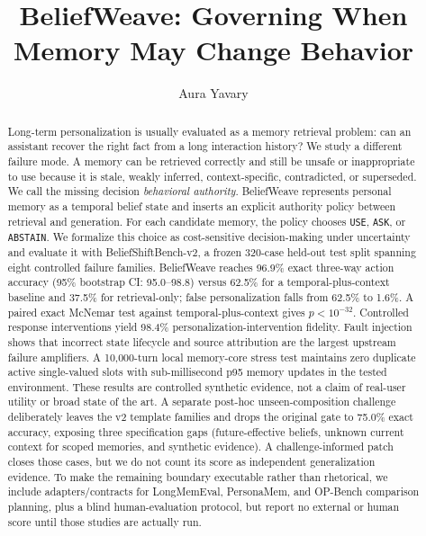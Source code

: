 \documentclass[10pt]{article}
\title{\vspace{-1.1em}\textbf{BeliefWeave: Governing When Memory May Change Behavior}}
\author{Aura Yavary}
\date{}
\begin{document}
\maketitle

\begin{abstract}
Long-term personalization is usually evaluated as a memory retrieval problem: can an assistant recover the right fact from a long interaction history? We study a different failure mode. A memory can be retrieved correctly and still be unsafe or inappropriate to use because it is stale, weakly inferred, context-specific, contradicted, or superseded. We call the missing decision \emph{behavioral authority}. BeliefWeave represents personal memory as a temporal belief state and inserts an explicit authority policy between retrieval and generation. For each candidate memory, the policy chooses \texttt{USE}, \texttt{ASK}, or \texttt{ABSTAIN}. We formalize this choice as cost-sensitive decision-making under uncertainty and evaluate it with BeliefShiftBench-v2, a frozen 320-case held-out test split spanning eight controlled failure families. BeliefWeave reaches 96.9\% exact three-way action accuracy (95\% bootstrap CI: 95.0--98.8) versus 62.5\% for a temporal-plus-context baseline and 37.5\% for retrieval-only; false personalization falls from 62.5\% to 1.6\%. A paired exact McNemar test against temporal-plus-context gives $p<10^{-32}$. Controlled response interventions yield 98.4\% personalization-intervention fidelity. Fault injection shows that incorrect state lifecycle and source attribution are the largest upstream failure amplifiers. A 10,000-turn local memory-core stress test maintains zero duplicate active single-valued slots with sub-millisecond p95 memory updates in the tested environment. These results are controlled synthetic evidence, not a claim of real-user utility or broad state of the art. A separate post-hoc unseen-composition challenge deliberately leaves the v2 template families and drops the original gate to 75.0\% exact accuracy, exposing three specification gaps (future-effective beliefs, unknown current context for scoped memories, and synthetic evidence). A challenge-informed patch closes those cases, but we do not count its score as independent generalization evidence. To make the remaining boundary executable rather than rhetorical, we include adapters/contracts for LongMemEval, PersonaMem, and OP-Bench comparison planning, plus a blind human-evaluation protocol, but report no external or human score until those studies are actually run.
\end{abstract}
\end{document}
